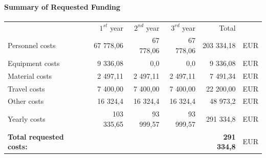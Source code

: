 \documentclass[11pt,a4paper,titlepage,oneside,onecolumn]{article}
\begin{document}
\paragraph{Summary of Requested Funding}
\begin{center}
\begin{tabular}{lrrrrl}
                        & $1^{st}$ year  &  $2^{nd}$ year & $3^{rd}$ year & Total & \\
Personnel costs   &  67 778,06 & 67 778,06 & 67 778,06  & 203 334,18 & EUR \\
Equipment costs   &  9 336,08 &  0,0 &  0,0 &  9 336,08 & EUR \\
Material costs    &  2 497,11  &  2 497,11  &  2 497,11  &  7 491,34 & EUR \\
Travel costs      &  7 400,00  & 7 400,00   & 7 400,00  &  22 200,00 & EUR \\
Other costs       &  16	324,4  & 16	324,4  & 16	324,4  &  48 973,2 & EUR \\
Yearly costs      & 103 335,65 & 93 999,57 & 93 999,57  & 291 334,8 & EUR \\
\hline
\textbf{Total requested costs:}    &   & & & \textbf{291 334,8} & EUR \\
\end{tabular}
\end{center}

\newpage
{}
\linespread{1.0}
\begin{small}


\end{small}
\end{document}
